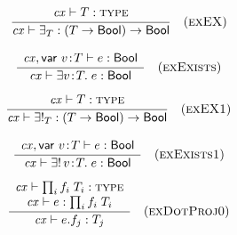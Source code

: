 \begin{theorem}\label{thm-eexop}
{\rm
\[
\rruleI
 {\istyO{\typ}}
 {\hastyO{\exopO}{\tarr{(\tarr{\typ}{\bool})}{\bool}}}
 {\Reexop}
\]
}
\end{theorem}

\begin{theorem}\label{thm-eex}
{\rm
\[
\rruleI
 {\hasty{\snoc{\cx}{\vdecO}}{\expr}{\bool}}
 {\hastyO{\exO}{\bool}}
 {\Reex}
\]
}
\end{theorem}

\begin{theorem}\label{thm-eexIop}
{\rm
\[
\rruleI
 {\istyO{\typ}}
 {\hastyO{\exIopO}{\tarr{(\tarr{\typ}{\bool})}{\bool}}}
 {\ReexIop}
\]
}
\end{theorem}

\begin{theorem}\label{thm-eexI}
{\rm
\[
\rruleI
 {\hasty{\snoc{\cx}{\vdecO}}{\expr}{\bool}}
 {\hastyO{\exIO}{\bool}}
 {\ReexI}
\]
}
\end{theorem}

\begin{theorem}\label{thm-edotO}
{\rm
\[
\rruleII
 {\istyO{\trecO}}
 {\hastyO{\expr}{\trecO}}
 {\hastyO{\proj{\expr}{\fnam_j}}{\typ_j}}
 {\RedotO}
\]
}
\end{theorem}



